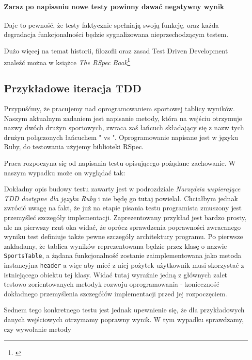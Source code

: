     \paragraph{Zaraz po napisaniu nowe testy powinny dawać negatywny wynik}
      Daje to pewność, że testy faktycznie spełniają swoją funkcję, oraz każda degradacja funkcjonalności będzie sygnalizowana nieprzechodzącym testem.
      
      Dużo więcej na temat historii, filozofii oraz zasad Test Driven Development znaleźć można w książce \emph{The RSpec Book}\footnote{\cite{rspec_book}}
      
  \subsection{Przykładowe iteracja TDD}
    Przypuśćmy, że pracujemy nad oprogramowaniem sportowej tablicy wyników. Naszym aktualnym zadaniem jest napisanie metody, która na wejściu otrzymuje nazwy dwóch drużyn sportowych, zwraca zaś łańcuch składający się z nazw tych drużyn połączonych łańcuchem " vs ". Oprogramowanie napisane jest w języku Ruby, do testowania użyjemy biblioteki RSpec.
    
    Praca rozpoczyna się od napisania testu opisującego pożądane zachowanie. W naszym wypadku może on wyglądać tak: 
    
    

    Dokładny opis budowy testu zawarty jest w podrozdziale \emph{Narzędzia wspierające TDD dostępne dla języka Ruby} i nie będę go tutaj powielał. Chciałbym jednak zwrócić uwagę na fakt, że już na etapie pisania testu programista zmuszony jest przemyśleć szczegóły implementacji. Zaprezentowany przykład jest bardzo prosty, ale na pierwszy rzut oka widać, że oprócz sprawdzenia poprawności zwracanego wyniku test definiuje także pewne szczegóły architektury programu. Po pierwsze zakładamy, że tablica wyników reprezentowana będzie przez klasę o nazwie \verb+SportsTable+, a żądana funkcjonalność zostanie zaimplementowana jako metoda instancyjna \verb+header+ a więc aby mieć z niej pożytek użytkownik musi skorzystać z istniejącego obiektu tej klasy. Widać tutaj wyraźnie jedną z głównych zalet testowo zorientowanych metodyk rozwoju oprogramowania - konieczność dokładnego przemyślenia szczegółów implementacji przed jej rozpoczęciem.
    
    Sednem tego konkretnego testu jest jednak upewnienie się, że dla przykładowych danych wejściowych otrzymamy poprawny wynik. W tym wypadku sprawdzamy, czy wywołanie metody 
    
